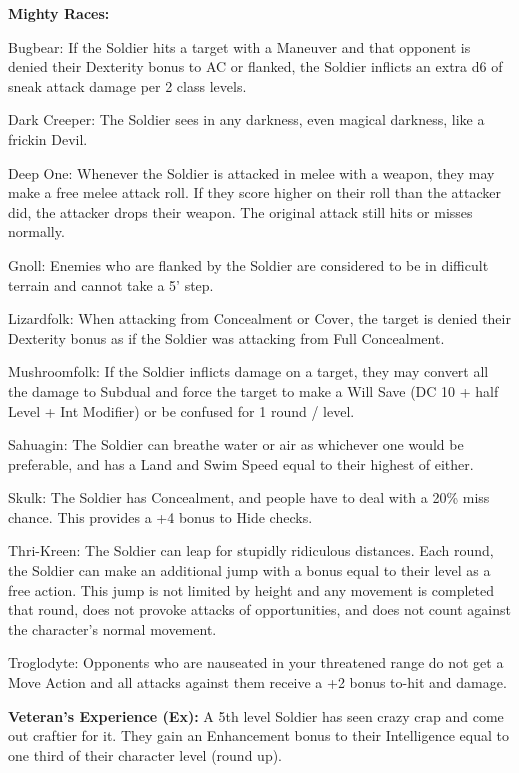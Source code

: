 \textbf{Mighty Races:}
\begin{description*}
\item[Bugbear:] If the Soldier hits a target with a Maneuver and that opponent is denied their Dexterity bonus to AC or flanked, the Soldier inflicts an extra d6 of sneak attack damage per 2 class levels.
\item[Dark Creeper:] The Soldier sees in any darkness, even magical darkness, like a frickin Devil.
\item[Deep One:] Whenever the Soldier is attacked in melee with a weapon, they may make a free melee attack roll. If they score higher on their roll than the attacker did, the attacker drops their weapon. The original attack still hits or misses normally.
\item[Gnoll:] Enemies who are flanked by the Soldier are considered to be in difficult terrain and cannot take a 5' step.
\item[Lizardfolk:] When attacking from Concealment or Cover, the target is denied their Dexterity bonus as if the Soldier was attacking from Full Concealment.
\item[Mushroomfolk:] If the Soldier inflicts damage on a target, they may convert all the damage to Subdual and force the target to make a Will Save (DC 10 + half Level + Int Modifier) or be confused for 1 round / level.
\item[Sahuagin:] The Soldier can breathe water or air as whichever one would be preferable, and has a Land and Swim Speed equal to their highest of either.
\item[Skulk:] The Soldier has Concealment, and people have to deal with a 20\% miss chance. This provides a +4 bonus to Hide checks.
\item[Thri-Kreen:] The Soldier can leap for stupidly ridiculous distances. Each round, the Soldier can make an additional jump with a bonus equal to their level as a free action. This jump is not limited by height and any movement is completed that round, does not provoke attacks of opportunities, and does not count against the character's normal movement.
\item[Troglodyte:] Opponents who are nauseated in your threatened range do not get a Move Action and all attacks against them receive a +2 bonus to-hit and damage.
\end{description*}

\textbf{Veteran's Experience (Ex):} A 5th level Soldier has seen crazy crap and come out craftier for it. They gain an Enhancement bonus to their Intelligence equal to one third of their character level (round up).

